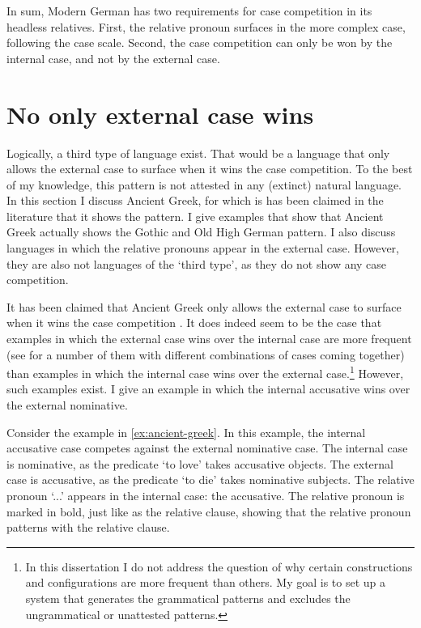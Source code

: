 In sum, Modern German has two requirements for case competition in its headless relatives. First, the relative pronoun surfaces in the more complex case, following the case scale. Second, the case competition can only be won by the internal case, and not by the external case.

\section{No only external case wins}

Logically, a third type of language exist. That would be a language that only allows the external case to surface when it wins the case competition. To the best of my knowledge, this pattern is not attested in any (extinct) natural language. In this section I discuss Ancient Greek, for which is has been claimed in the literature that it shows the pattern. I give examples that show that Ancient Greek actually shows the Gothic and Old High German pattern. I also discuss languages in which the relative pronouns appear in the external case. However, they are also not languages of the `third type', as they do not show any case competition.

It has been claimed that Ancient Greek only allows the external case to surface when it wins the case competition  \citep[cf.][]{cinqueforthcoming}. It does indeed seem to be the case that examples in which the external case wins over the internal case are more frequent (see \citealt{kakarikos2014} for a number of them with different combinations of cases coming together) than examples in which the internal case wins over the external case.\footnote{
In this dissertation I do not address the question of why certain constructions and configurations are more frequent than others. My goal is to set up a system that generates the grammatical patterns and excludes the ungrammatical or unattested patterns.
}
However, such examples exist. I give an example in which the internal accusative wins over the external nominative.

Consider the example in \ref{ex:ancient-greek}. In this example, the internal accusative case competes against the external nominative case.
The internal case is nominative, as the predicate  `to love' takes accusative objects.
The external case is accusative, as the predicate  `to die' takes nominative subjects.
The relative pronoun  `...' appears in the internal case: the accusative. The relative pronoun is marked in bold, just like as the relative clause, showing that the relative pronoun patterns with the relative clause.

